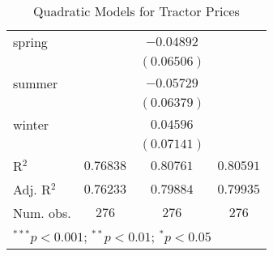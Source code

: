 \begin{table}
\begin{center}
\begin{tabular}{l c c c}
spring              &                  & $-0.04892$       &                  \\
                    &                  & $(0.06506)$      &                  \\
summer              &                  & $-0.05729$       &                  \\
                    &                  & $(0.06379)$      &                  \\
winter              &                  & $0.04596$        &                  \\
                    &                  & $(0.07141)$      &                  \\
\hline
R$^2$               & $0.76838$        & $0.80761$        & $0.80591$        \\
Adj. R$^2$          & $0.76233$        & $0.79884$        & $0.79935$        \\
Num. obs.           & $276$            & $276$            & $276$            \\
\hline
\multicolumn{4}{l}{\scriptsize{$^{***}p<0.001$; $^{**}p<0.01$; $^{*}p<0.05$}}
\end{tabular}
\caption{Quadratic Models for Tractor Prices}
\label{tab:reg_sq_horse}
\end{center}
\end{table}
